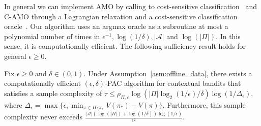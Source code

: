 \documentclass{article}
\newcommand{\mc}[1]{\mathcal{#1}}
\newcommand{\lalit}[1]{\textcolor{blue}{}}
\newcommand{\1}{\mathbf{1}}
\begin{document}
In general we can implement \textsf{AMO} by calling to cost-sensitive classification~ \cite{dudik2011efficient,beygelzimer2005error} and \textsf{C-AMO} through a Lagrangian relaxation and a cost-sensitive classification oracle~\cite{agarwal2018reductions, cotter2019training}.
Our algorithm uses an argmax oracle as a subroutine at most a polynomial number of times in $\epsilon^{-1}, \log(1/\delta), |\mathcal{A}|$ and $\log(|\Pi|)$. In this sense, it is computationally efficient.
The following sufficiency result holds for general $\epsilon \geq 0$.
\begin{theorem}\label{thm:upper_informal}
Fix $\epsilon \geq 0$ and $\delta \in (0,1)$.
Under Assumption~\ref{asm:offline_data}, there exists a computationally efficient $(\epsilon,\delta)$-PAC algorithm for contextual bandits that satisfies a sample complexity of $\tau \leq \rho_{\Pi,\epsilon} \log( |\Pi|\log_2(1/\epsilon) /\delta ) \log(1/\Delta_\epsilon)$, where $\Delta_\epsilon = \max\{ \epsilon, \min_{\pi \in \Pi \setminus \pi_*}V(\pi_*)-V(\pi) \}$.
Furthermore, this sample complexity never exceeds $\frac{|\mc{A}|(\log(|\Pi|)+\log(1/\delta)) \log(1/\epsilon)}{\epsilon^2}$.
\end{theorem}
\end{document}
